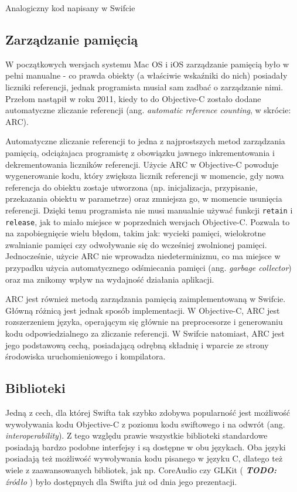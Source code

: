 \documentclass[mgr, shortabstract]{iithesis}
\newcommand{\todo}[1]{
  \textit{\textbf{TODO: }#1}
}
\newcommand{\ang}[1]{ang. \textit{#1}}
\newcommand{\swiftlisting}[2]{
    \swiftcode{src/#1.swift}
    \begin{listing}[ht]
      \caption{#2}
      \label{l:#1}
    \end{listing}
}
\begin{document}
\swiftlisting{3_swift_example}{Analogiczny kod napisany w Swifcie}

\subsection{Zarządzanie pamięcią}
\label{s:zarzadzanie_pamiecia}

W początkowych wersjach systemu Mac OS i iOS zarządzanie pamięcią było w pełni manualne - co prawda obiekty (a właściwie wskaźniki do nich) posiadały liczniki referencji, jednak programista musiał sam zadbać o zarządzanie nimi. Przełom nastąpił w roku 2011, kiedy to do Objective-C zostało dodane automatyczne zliczanie referencji (\ang{automatic reference counting}, w skrócie: ARC).

Automatyczne zliczanie referencji to jedna z najprostszych metod zarządzania pamięcią, odciążajaca programistę z obowiązku jawnego inkrementowania i dekrementowania liczników referencji. Użycie ARC w Objective-C powoduje wygenerowanie kodu, który zwiększa licznik referencji w momencie, gdy nowa referencja do obiektu zostaje utworzona (np. inicjalizacja, przypisanie, przekazania obiektu w parametrze) oraz zmniejsza go, w momencie usunięcia referencji. Dzięki temu programista nie musi manualnie używać funkcji \texttt{retain} i \texttt{release}, jak to miało miejsce w poprzednich wersjach Objective-C. Pozwala to na zapobiegnięcie wielu błędom, takim jak: wycieki pamięci, wielokrotne zwalnianie pamięci czy odwoływanie się do wcześniej zwolnionej pamięci. Jednocześnie, użycie ARC nie wprowadza niedeterminizmu, co ma miejsce w przypadku użycia automatycznego odśmiecania pamięci (\ang{garbage collector}) oraz ma znikomy wpływ na wydajność działania aplikacji.

ARC jest również metodą zarządzania pamięcią zaimplementowaną w Swifcie. Główną różnicą jest jednak sposób implementacji. W Objective-C, ARC jest rozszerzeniem języka, operającym się głównie na preprocesorze i generowaniu kodu odpowiedzialnego za zliczanie referencji. W Swifcie natomiast, ARC jest jego podstawową cechą, posiadającą odrębną składnię i wparcie ze strony środowiska uruchomieniowego i kompilatora.

\subsection{Biblioteki}

Jedną z cech, dla której Swifta tak szybko zdobywa popularność jest możliwość wywoływania kodu Objective-C z poziomu kodu swiftowego i na odwrót (\ang{interoperability}). Z tego względu prawie wszystkie biblioteki standardowe posiadają bardzo podobne interfejsy i są dostępne w obu językach. Oba języki posiadają też możliwość wywoływania kodu pisanego w języku C, dlatego też wiele z zaawansowanych bibliotek, jak np. CoreAudio czy GLKit (\todo{źródło}) było dostępnych dla Swifta już od dnia jego prezentacji.
\end{document}
